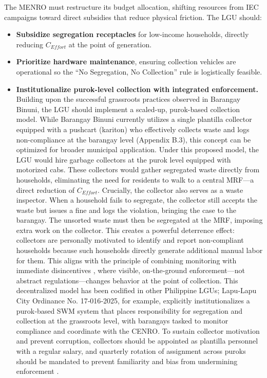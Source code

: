The MENRO must restructure its budget allocation, shifting resources from IEC campaigns toward direct subsidies that reduce physical friction. The LGU should:
\begin{itemize}
    \item \textbf{Subsidize segregation receptacles} for low-income households, directly reducing $C_{Effort}$ at the point of generation.
    \item \textbf{Prioritize hardware maintenance}, ensuring collection vehicles are operational so the ``No Segregation, No Collection'' rule is logistically feasible.
    \item \textbf{Institutionalize purok-level collection with integrated enforcement.} Building upon the successful grassroots practices observed in Barangay Binuni, the LGU should implement a scaled-up, purok-based collection model. While Barangay Binuni currently utilizes a single plantilla collector equipped with a pushcart (kariton) who effectively collects waste and logs non-compliance at the barangay level (Appendix B.3), this concept can be optimized for broader municipal application. Under this proposed model, the LGU would hire garbage collectors at the purok level equipped with motorized cabs. These collectors would gather segregated waste directly from households, eliminating the need for residents to walk to a central MRF—a direct reduction of $C_{Effort}$. Crucially, the collector also serves as a waste inspector. When a household fails to segregate, the collector still accepts the waste but issues a fine and logs the violation, bringing the case to the barangay. The unsorted waste must then be segregated at the MRF, imposing extra work on the collector. This creates a powerful deterrence effect: collectors are personally motivated to identify and report non‑compliant households because such households directly generate additional manual labor for them. This aligns with the principle of combining monitoring with immediate disincentives \citep{Ma2023}, where visible, on‑the‑ground enforcement—not abstract regulations—changes behavior at the point of collection. This decentralized model has been codified in other Philippine LGUs; Lapu‑Lapu City Ordinance No. 17‑016‑2025, for example, explicitly institutionalizes a purok‑based SWM system that places responsibility for segregation and collection at the grassroots level, with barangays tasked to monitor compliance and coordinate with the CENRO. To sustain collector motivation and prevent corruption, collectors should be appointed as plantilla personnel with a regular salary, and quarterly rotation of assignment across puroks should be mandated to prevent familiarity and bias from undermining enforcement \citep{Ma2023}.
\end{itemize}

